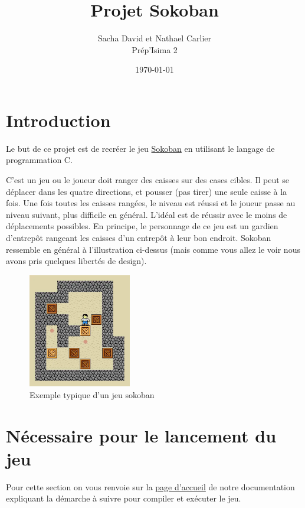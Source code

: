 \documentclass[french, 12pt]{article}
\title{Projet Sokoban}
\author{Sacha David et Nathael Carlier\\
       Prép'Isima 2}
\date{\today}
\begin{document}
\maketitle


\tableofcontents


\section{Introduction}


   Le but de ce projet est de recréer le jeu \href{https://fr.wikipedia.org/wiki/Sokoban}{Sokoban} en utilisant le langage de programmation C.


   C'est un jeu ou le joueur doit ranger des caisses sur des cases cibles. Il peut se déplacer dans les quatre directions, et pousser (pas tirer) une seule caisse à la fois. Une fois toutes les caisses rangées, le niveau est réussi et le joueur passe au niveau suivant, plus difficile en général. L'idéal est de réussir avec le moins de déplacements possibles. En principe, le personnage de ce jeu est un gardien d'entrepôt rangeant les caisses d'un entrepôt à leur bon endroit. Sokoban ressemble en général à l'illustration ci-dessus (mais comme vous allez le voir nous avons pris quelques libertés de design).


   \begin{figure}[h]
       \centering
       \includegraphics[width=0.4\textwidth]{illustration/base_sokoban.png}
       \caption{Exemple typique d'un jeu sokoban}
   \end{figure}


\section{Nécessaire pour le lancement du jeu}


Pour cette section on vous renvoie sur la \href{../doc/redirect.html}{page d'accueil} de notre documentation expliquant la démarche à suivre pour compiler et exécuter le jeu.
\end{document}
